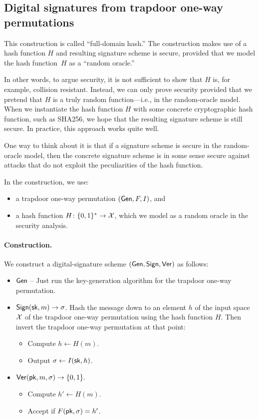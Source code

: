 \subsection{Digital signatures from trapdoor one-way permutations}

This construction is called ``full-domain hash.''\autocite{BR93}
The construction makes use of a hash function $H$ and resulting
signature scheme is secure, provided that we model the hash function~$H$
as a ``random oracle.''

In other words, to argue security, it is not sufficient to show that
$H$ is, for example, collision resistant.
Instead, we can only prove security provided that we pretend that $H$
is a truly random function---i.e., in the random-oracle model.
When we instantiate the hash function $H$ with some concrete cryptographic
hash function, such as SHA256, we hope that the resulting signature
scheme is still secure.
In practice, this approach works quite well.

One way to think about it is that if a signature scheme is secure
in the random-oracle model, then the concrete signature scheme
is in some sense secure against attacks that do not exploit the peculiarities
of the hash function.

\medskip 

In the construction, we use:
\begin{itemize}
  \item a trapdoor one-way permutation $(\mathsf{Gen}, F, I)$, and
  \item a hash function $H \colon \{0,1\}^* \to \mathcal{X}$,
        which we model as a random oracle in the
        security analysis.
\end{itemize}

\paragraph{Construction.}
We construct a digital-signature scheme $(\mathsf{Gen}, \mathsf{Sign}, \mathsf{Ver})$ as follows:
\begin{itemize}
  \item $\mathsf{Gen}$ -- Just run the key-generation algorithm for the
        trapdoor one-way permutation.
  \item $\mathsf{Sign}({\mathsf{sk}}, m) \to \sigma$.
        Hash the message down to an element $h$ of the input space $\mathcal{X}$
        of the trapdoor one-way permutation using the hash function $H$. Then invert
        the trapdoor one-way permutation at that point:
        \begin{itemize}
          \item Compute $h \gets H(m)$.
          \item Output $\sigma \gets I({\mathsf{sk}}, h)$.
        \end{itemize}
      \item $\mathsf{Ver}(\mathsf{pk}, m, \sigma) \to \{0,1\}.$ 
        \begin{itemize}
          \item Compute $h' \gets H(m)$.
          \item Accept if $F(\mathsf{pk}, \sigma) = h'$.
        \end{itemize}
\end{itemize}

